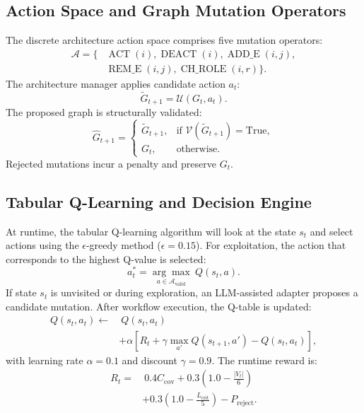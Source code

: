 \documentclass[conference]{IEEEtran}
\begin{document}
\subsection{Action Space and Graph Mutation Operators}
The discrete architecture action space comprises five mutation operators:
\begin{equation}
\begin{aligned}
\mathcal{A} = \{ & \operatorname{ACT}(i), \operatorname{DEACT}(i), \operatorname{ADD\_E}(i,j), \\
& \operatorname{REM\_E}(i,j), \operatorname{CH\_ROLE}(i,r) \}.
\end{aligned}
\end{equation}
The architecture manager applies candidate action $a_t$:
\begin{equation}
\widetilde{G}_{t+1} = \mathcal{U}(G_t, a_t).
\end{equation}
The proposed graph is structurally validated:
\begin{equation}
\widehat{G}_{t+1} = \begin{cases}
\widetilde{G}_{t+1}, & \text{if } \mathcal{V}(\widetilde{G}_{t+1}) = \text{True}, \\
G_t, & \text{otherwise}.
\end{cases}
\end{equation}
Rejected mutations incur a penalty and preserve $G_t$.

\subsection{Tabular Q-Learning and Decision Engine}
At runtime, the tabular Q-learning algorithm will look at the state $s_t$ and select actions using the $\epsilon$-greedy method ($\epsilon = 0.15$). For exploitation, the action that corresponds to the highest Q-value is selected:
\begin{equation}
a_t^* = \underset{a \in \mathcal{A}_{\mathrm{valid}}}{\arg\max} \ Q(s_t, a).
\end{equation}
If state $s_t$ is unvisited or during exploration, an LLM-assisted adapter proposes a candidate mutation. After workflow execution, the Q-table is updated:
\begin{equation}
\begin{aligned}
Q(s_t, a_t) \leftarrow & \ Q(s_t, a_t) \\
& + \alpha \left[ R_t + \gamma \max_{a'} Q(s_{t+1}, a') - Q(s_t, a_t) \right],
\end{aligned}
\end{equation}
with learning rate $\alpha = 0.1$ and discount $\gamma = 0.9$. The runtime reward is:
\begin{equation}
\begin{aligned}
R_t = & \ 0.4 C_{\mathrm{cov}} + 0.3 \left(1.0 - \frac{|V_t|}{6}\right) \\
& + 0.3 \left(1.0 - \frac{L_{\mathrm{crit}}}{5}\right) - P_{\mathrm{reject}}.
\end{aligned}
\end{equation}
\end{document}
